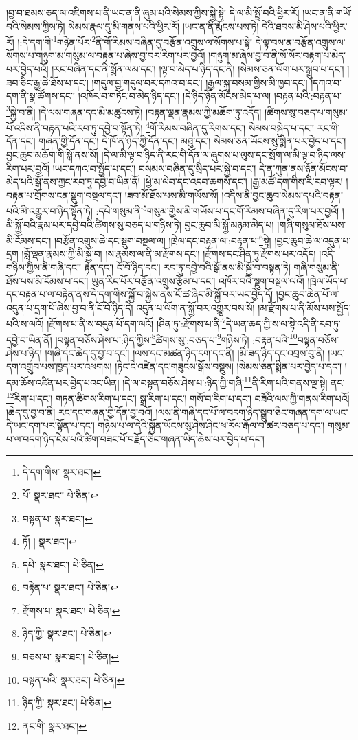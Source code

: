 །བྱ་བ་ཐམས་ཅད་ལ་འཇིགས་པ་ནི་ཡང་ན་ནི་ཞུམ་པའི་སེམས་ཀྱིས་སྐྱེ་སྟེ། དེ་ལ་མི་སྤྲོ་བའི་ཕྱིར་རོ། །ཡང་ན་ནི་གཡོ་བའི་སེམས་ཀྱིས་ཏེ། སེམས་རྣལ་དུ་མི་གནས་པའི་ཕྱིར་རོ། །ཡང་ན་ནི་རྨོངས་པས་ཏེ། དེའི་ཐབས་མི་ཤེས་པའི་ཕྱིར་རོ། །:དེ་དག་གི་\footnote{དེ་དག་གིས་  སྣར་ཐང་། }གཉེན་པོར་\footnote{པོ་  སྣར་ཐང་།  པེ་ཅིན། }ནི་གོ་རིམས་བཞིན་དུ་བརྩོན་འགྲུས་ལ་སོགས་པ་སྟེ། དེ་ལྟ་བས་ན་བརྩོན་འགྲུས་ལ་སོགས་པ་གཉུག་མ་གསུམ་ལ་བརྟན་པ་ཞེས་བྱ་བར་རིག་པར་བྱའོ། །གཉུག་མ་ཞེས་བྱ་བ་ནི་སོ་སོར་བརྟག་པ་མེད་པར་བྱེད་པའོ། །རང་བཞིན་དང་ནི་སྨོན་ལམ་དང་། །ལྟ་བ་མེད་པ་ཉིད་དང་ནི། །སེམས་ཅན་ལོག་པར་སྒྲུབ་པ་དང་། །
ཟབ་ཅིང་རྒྱ་ཆེ་ཐོས་པ་དང་། །གདུལ་བྱ་གདུལ་བར་དཀའ་བ་དང་། །རྒྱལ་སྐུ་བསམ་གྱིས་མི་ཁྱབ་དང་། །དཀའ་བ་དག་ནི་སྣ་ཚོགས་དང་། །འཁོར་བ་གཏོང་བ་མེད་ཉིད་དང་། །དེ་ཉིད་ཉོན་མོངས་མེད་པ་ལ། །བརྟན་པའི་:བརྟན་པ་\footnote{བསྟན་པ་  སྣར་ཐང་། }སྐྱེ་བ་ནི། །དེ་ལས་གཞན་དང་མི་མཚུངས་ཏེ། །བརྟན་ལྡན་རྣམས་ཀྱི་མཆོག་ཏུ་འདོད། །ཚིགས་སུ་བཅད་པ་གསུམ་པོ་འདིས་ནི་བརྟན་པའི་རབ་ཏུ་དབྱེ་བ་སྟོན་ཏེ། \footnote{ཏོ། །   སྣར་ཐང་། }གོ་རིམས་བཞིན་དུ་རིགས་དང་། སེམས་བསྐྱེད་པ་དང་། རང་གི་དོན་དང་། གཞན་གྱི་དོན་དང་། དེ་ཁོ་ན་ཉིད་ཀྱི་དོན་དང་། མཐུ་དང་། སེམས་ཅན་ཡོངས་སུ་སྨིན་པར་བྱེད་པ་དང་། བྱང་ཆུབ་མཆོག་གི་སྒོ་ནས་སོ། །དེ་ལ་མི་ལྟ་བ་ཉིད་ནི་རང་གི་དོན་ལ་ཞུགས་པ་ལུས་དང་སྲོག་ལ་མི་ལྟ་བ་ཉིད་ལས་རིག་པར་བྱའོ། །ཡང་དཀའ་བ་སྤྱོད་པ་དང་། བསམས་བཞིན་དུ་སྲིད་པར་སྐྱེ་བ་དང་། དེ་ན་ཀུན་ནས་ཉོན་མོངས་བ་མེད་པའི་སྒོ་ནས་ཀྱང་རབ་ཏུ་དབྱེ་བ་ཡིན་ནོ། །ཕྱེ་མ་ལེབ་དང་འདབ་ཆགས་དང་། །རྒྱ་མཚོ་དག་གིས་རི་རབ་ལྟར། །བརྟན་པ་གྲོགས་ངན་སྡུག་བསྔལ་དང་། །ཟབ་མོ་ཐོས་པས་མི་གཡོས་སོ། །འདིས་ནི་བྱང་ཆུབ་སེམས་དཔའི་བརྟན་པའི་མི་འགྱུར་བ་ཉིད་སྟོན་ཏེ། :དཔེ་གསུམ་ནི་\footnote{དཔེ་  སྣར་ཐང་།  པེ་ཅིན། }གསུམ་གྱིས་མི་གཡོས་པ་དང་གོ་རིམས་བཞིན་དུ་རིག་པར་བྱའོ། །མི་སྐྱོ་བའི་རྣམ་པར་དབྱེ་བའི་ཚིགས་སུ་བཅད་པ་གཉིས་ཏེ། བྱང་ཆུབ་མི་སྐྱོ་མཉམ་མེད་པ། །གཞི་གསུམ་ཐོས་པས་མི་ངོམས་དང་། །བརྩོན་འགྲུས་ཆེ་དང་སྡུག་བསྔལ་ལ། །ཁྲེལ་དང་བརྟན་ལ་:བརྟན་པ་\footnote{བརྟེན་པ་  སྣར་ཐང་།  པེ་ཅིན། }སྟེ། །བྱང་ཆུབ་ཆེ་ལ་འདུན་པ་དྲག །བློ་ལྡན་རྣམས་ཀྱི་མི་སྐྱོ་བ། །ས་རྣམས་ལ་ནི་མ་རྫོགས་དང་། །རྫོགས་དང་ཤིན་ཏུ་རྫོགས་པར་འདོད། །འདི་གཉིས་ཀྱིས་ནི་གཞི་དང་། རྟེན་དང་། ངོ་བོ་ཉིད་དང་། རབ་ཏུ་དབྱེ་བའི་སྒོ་ནས་མི་སྐྱོ་བ་བསྟན་ཏེ། གཞི་གསུམ་ནི་ཐོས་པས་མི་ངོམས་པ་དང་། ཡུན་རིང་པོར་བརྩོན་འགྲུས་རྩོམ་པ་དང་། འཁོར་བའི་སྡུག་བསྔལ་ལའོ། །ཁྲེལ་ཡོད་པ་དང་བརྟན་པ་ལ་བརྟེན་ནས་དེ་དག་གིས་སྐྱོ་བ་སྐྱེས་ནས་ངོ་ཚ་ཞིང་མི་སྐྱོ་བར་ཡང་བྱེད་དོ། །བྱང་ཆུབ་ཆེན་པོ་ལ་འདུན་པ་དྲག་པོ་ཞེས་བྱ་བ་ནི་ངོ་བོ་ཉིད་དེ། འདུན་པ་ལོག་ན་སྐྱོ་བར་འགྱུར་བས་སོ། །མ་རྫོགས་པ་ནི་མོས་པས་སྤྱོད་པའི་ས་ལའོ། །རྫོགས་པ་ནི་ས་བདུན་པོ་དག་ལའོ། །ཤིན་ཏུ་:རྫོགས་པ་ནི་\footnote{རྫོགས་པ་  སྣར་ཐང་།  པེ་ཅིན། }དེ་ཡན་ཆད་ཀྱི་ས་ལ་སྟེ་འདི་ནི་རབ་ཏུ་དབྱེ་བ་ཡིན་ནོ། །བསྟན་བཅོས་ཤེས་པ་:ཉིད་ཀྱིས་\footnote{ཉིད་ཀྱི་  སྣར་ཐང་།  པེ་ཅིན། }ཚིགས་སུ་:བཅད་པ་\footnote{བཅས་པ་  སྣར་ཐང་།  པེ་ཅིན། }གཉིས་ཏེ། :བརྟན་པའི་\footnote{བསྟན་པའི་  སྣར་ཐང་།  པེ་ཅིན། }བསྟན་བཅོས་ཤེས་པ་ཉིད། །གཞི་དང་ཆེད་དུ་བྱ་བ་དང་། །ལས་དང་མཚན་ཉིད་དག་དང་ནི། །མི་ཟད་ཉིད་དང་འབྲས་བུ་ནི། །ཡང་དག་འགྲུབ་པས་ཁྱད་པར་འཕགས། །ཏིང་ངེ་འཛིན་དང་གཟུངས་སྒོས་བསྡུས། །སེམས་ཅན་སྨིན་པར་བྱེད་པ་དང་། །དམ་ཆོས་འཛིན་པར་བྱེད་པའང་ཡིན། །དེ་ལ་བསྟན་བཅོས་ཤེས་པ་:ཉིད་ཀྱི་གཞི་\footnote{ཉིད་ཀྱི་  སྣར་ཐང་།  པེ་ཅིན། }ནི་རིག་པའི་གནས་ལྔ་སྟེ། ནང་\footnote{ནང་གི་  སྣར་ཐང་། }རིག་པ་དང་། གཏན་ཚིགས་རིག་པ་དང་། སྒྲ་རིག་པ་དང་། གསོ་བ་རིག་པ་དང་། བཟོའི་ལས་ཀྱི་གནས་རིག་པའོ། །ཆེད་དུ་བྱ་བ་ནི། རང་དང་གཞན་གྱི་དོན་བྱ་བའོ། །ལས་ནི་གཞི་དང་པོ་ལ་བདག་ཉིད་སྒྲུབ་ཅིང་གཞན་དག་ལ་ཡང་དེ་ཡང་དག་པར་སྟོན་པ་དང་། གཉིས་པ་ལ་དེའི་སྐྱོན་ཡོངས་སུ་ཤེས་ཤིང་ཕ་རོལ་རྒོལ་བ་ཚར་བཅད་པ་དང་། གསུམ་པ་ལ་བདག་ཉིད་ངེས་པའི་ཚིག་བཟང་པོ་བརྗོད་ཅིང་གཞན་ཡིད་ཆེས་པར་བྱེད་པ་དང་། 